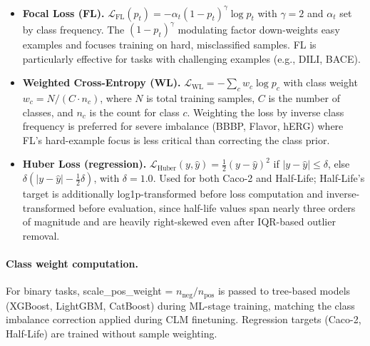 \documentclass[9pt,a4paper]{article}
\begin{document}
\begin{itemize}[leftmargin=2em]
\item \textbf{Focal Loss (FL).}
  $\mathcal{L}_\text{FL}(p_t) = -\alpha_t (1 - p_t)^\gamma \log p_t$
  with $\gamma = 2$ and $\alpha_t$ set by class frequency.
  The $(1 - p_t)^\gamma$ modulating factor down-weights easy examples and focuses
  training on hard, misclassified samples. FL is particularly effective for tasks
  with challenging examples (e.g., DILI, BACE).

\item \textbf{Weighted Cross-Entropy (WL).}
  $\mathcal{L}_\text{WL} = -\sum_c w_c \log p_c$
  with class weight $w_c = N / (C \cdot n_c)$, where $N$ is total training samples,
  $C$ is the number of classes, and $n_c$ is the count for class $c$.
  Weighting the loss by inverse class frequency is preferred for severe imbalance
  (BBBP, Flavor, hERG) where FL's hard-example focus is less critical
  than correcting the class prior.

\item \textbf{Huber Loss (regression).}
  $\mathcal{L}_\text{Huber}(y,\hat y) = \tfrac{1}{2}(y-\hat y)^2$ if $|y-\hat y|\le\delta$,
  else $\delta(|y-\hat y|-\tfrac12\delta)$, with $\delta=1.0$. Used for both Caco-2
  and Half-Life; Half-Life's target is additionally log1p-transformed before loss
  computation and inverse-transformed before evaluation, since half-life values
  span nearly three orders of magnitude and are heavily right-skewed even after
  IQR-based outlier removal.
\end{itemize}

\paragraph{Class weight computation.}
For binary tasks, scale\_pos\_weight = $n_\text{neg} / n_\text{pos}$ is passed to
tree-based models (XGBoost, LightGBM, CatBoost) during ML-stage training,
matching the class imbalance correction applied during CLM finetuning. Regression
targets (Caco-2, Half-Life) are trained without sample weighting.
\end{document}
